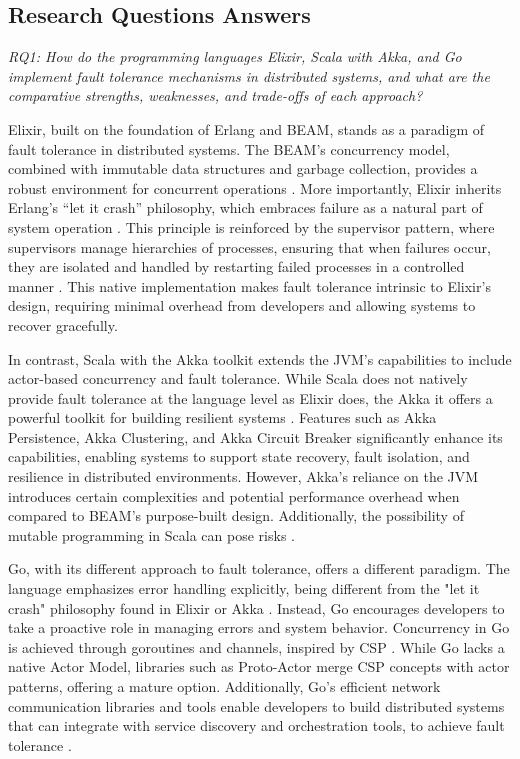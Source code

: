 \subsection{Research Questions Answers}

\textit{RQ1: How do the programming languages Elixir, Scala with Akka, and Go implement fault tolerance mechanisms in distributed systems, and what are the comparative strengths, weaknesses, and trade-offs of each approach?}

Elixir, built on the foundation of Erlang and \gls{BEAM}, stands as a paradigm of fault tolerance in distributed systems. The \gls{BEAM}'s concurrency model, combined with immutable data structures and garbage collection, provides a robust environment for concurrent operations \cite{Juric2024}. More importantly, Elixir inherits Erlang’s “let it crash” philosophy, which embraces failure as a natural part of system operation \cite{Armstrong2013}. This principle is reinforced by the supervisor pattern, where supervisors manage hierarchies of processes, ensuring that when failures occur, they are isolated and handled by restarting failed processes in a controlled manner \cite{Juric2024}. This native implementation makes fault tolerance intrinsic to Elixir’s design, requiring minimal overhead from developers and allowing systems to recover gracefully.

In contrast, Scala with the Akka toolkit extends the JVM’s capabilities to include actor-based concurrency and fault tolerance. While Scala does not natively provide fault tolerance at the language level as Elixir does, the Akka it offers a powerful toolkit for building resilient systems \cite{akka-docs,Abraham2023}. Features such as Akka Persistence, Akka Clustering, and Akka Circuit Breaker significantly enhance its capabilities, enabling systems to support state recovery, fault isolation, and resilience in distributed environments. However, Akka’s reliance on the JVM introduces certain complexities and potential performance overhead when compared to BEAM’s purpose-built design. Additionally, the possibility of mutable programming in Scala can pose risks \cite{akka-docs}.

Go, with its different approach to fault tolerance, offers a different paradigm. The language emphasizes error handling explicitly, being different from the "let it crash" philosophy found in Elixir or Akka \cite{go-docs}. Instead, Go encourages developers to take a proactive role in managing errors and system behavior. Concurrency in Go is achieved through goroutines and channels, inspired by \gls{CSP} \cite{proto-actor-docs}. While Go lacks a native Actor Model, libraries such as Proto-Actor merge CSP concepts with actor patterns, offering a mature option. Additionally, Go’s efficient network communication libraries and tools enable developers to build distributed systems that can integrate with service discovery and orchestration tools, to achieve fault tolerance \cite{Shuiskov2022}.

